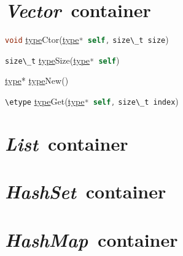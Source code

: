 \documentclass[a4paper]{article}
\newcommand{\type}{\underline{type}}
\newcommand{\etype}{\underline{element-type}}
\newcommand{\methx}[3]{\lstinline[language=C]{#1} \type{{#2}}(\type\lstinline[language=C]{* self,} \lstinline[language=C]{#3})}
\newcommand{\methz}[2]{\lstinline[language=C]{#1} \type{{#2}}(\type\lstinline[language=C]{* self})}
\newcommand{\newz}{\type* \type{New}()}
\begin{document}
\renewcommand{\vector}{\emph{Vector}}
\section{\vector\ container}


\methx{void}{Ctor}{size\_t size}


\methz{size\_t}{Size}


\newz


\methx{\etype}{Get}{size\_t index}


\renewcommand{\list}{\emph{List}}
\section{\list\ container}


\newcommand{\hashset}{\emph{HashSet}}
\section{\hashset\ container}


\newcommand{\hashmap}{\emph{HashMap}}
\section{\hashmap\ container}
\end{document}
